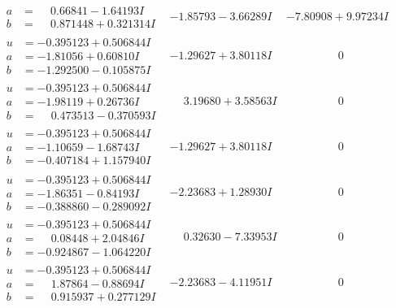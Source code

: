 \documentclass[1p]{elsarticle_modified}
\theoremstyle{definition}
\begin{document}
$$\begin{array}{c|c|c}
\begin{aligned}
a &= \phantom{-}0.66841 - 1.64193 I \\
b &= \phantom{-}0.871448 + 0.321314 I\end{aligned}
 & -1.85793 - 3.66289 I & -7.80908 + 9.97234 I \\ \hline\begin{aligned}
u &= -0.395123 + 0.506844 I \\
a &= -1.81056 + 0.60810 I \\
b &= -1.292500 - 0.105875 I\end{aligned}
 & -1.29627 + 3.80118 I & \phantom{-0.000000 } 0 \\ \hline\begin{aligned}
u &= -0.395123 + 0.506844 I \\
a &= -1.98119 + 0.26736 I \\
b &= \phantom{-}0.473513 - 0.370593 I\end{aligned}
 & \phantom{-}3.19680 + 3.58563 I & \phantom{-0.000000 } 0 \\ \hline\begin{aligned}
u &= -0.395123 + 0.506844 I \\
a &= -1.10659 - 1.68743 I \\
b &= -0.407184 + 1.157940 I\end{aligned}
 & -1.29627 + 3.80118 I & \phantom{-0.000000 } 0 \\ \hline\begin{aligned}
u &= -0.395123 + 0.506844 I \\
a &= -1.86351 - 0.84193 I \\
b &= -0.388860 - 0.289092 I\end{aligned}
 & -2.23683 + 1.28930 I & \phantom{-0.000000 } 0 \\ \hline\begin{aligned}
u &= -0.395123 + 0.506844 I \\
a &= \phantom{-}0.08448 + 2.04846 I \\
b &= -0.924867 - 1.064220 I\end{aligned}
 & \phantom{-}0.32630 - 7.33953 I & \phantom{-0.000000 } 0 \\ \hline\begin{aligned}
u &= -0.395123 + 0.506844 I \\
a &= \phantom{-}1.87864 - 0.88694 I \\
b &= \phantom{-}0.915937 + 0.277129 I\end{aligned}
 & -2.23683 - 4.11951 I & \phantom{-0.000000 } 0 \\ \hline\begin{aligned}

\end{aligned}
\end{array}$$
\end{document}
